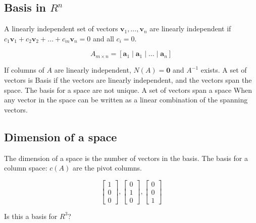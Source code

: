 \documentclass[main.tex]{subfiles}
\begin{document}
\subsection{Basis in $R^{n}$}

A linearly independent set of vectors $\bm{v}_1, \ldots, \bm{v}_n$ are linearly independent if $c_1\bm{v}_1 + c_2\bm{v}_2 + \ldots + c_m \bm{v}_n = 0$ and all $c_i = 0$. 

$$
A_{m \times n} = \left[\bm{a}_1 \mid \bm{a}_1 \mid \ldots \mid \bm{a}_n \right]
$$

If columns of $A$ are linearly independent, $N(A)=\bm{0}$ and $A^{-1}$ exists. A set of vectors is Basis if the vectors are linearly independent, and the vectors span the space. The basis for a space are not unique. A set of vectors span a space When any vector in the space can be written as a linear combination of the spanning vectors.

\subsection{Dimension of a space}

The dimension of a space is the number of vectors in the basis. The basis for a column space: $c(A)$ are the pivot columns.

$$
\left[\begin{array}{l}
1 \\
0 \\
0
\end{array}\right],\left[\begin{array}{l}
0 \\
1 \\
0
\end{array}\right],\left[\begin{array}{l}
0 \\
0 \\
1
\end{array}\right]
$$

Is this a basis for $R^{3}$? 
\end{document}
